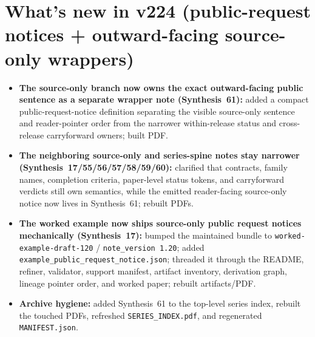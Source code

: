\documentclass[11pt]{article}
\begin{document}
\section{What's new in v224 (public-request notices + outward-facing source-only wrappers)}
\begin{itemize}[leftmargin=*]
\item \textbf{The source-only branch now owns the exact outward-facing public sentence as a separate wrapper note (Synthesis~61):} added a compact public-request-notice definition separating the visible source-only sentence and reader-pointer order from the narrower within-release status and cross-release carryforward owners; built PDF.
\item \textbf{The neighboring source-only and series-spine notes stay narrower (Synthesis~17/55/56/57/58/59/60):} clarified that contracts, family names, completion criteria, paper-level status tokens, and carryforward verdicts still own semantics, while the emitted reader-facing source-only notice now lives in Synthesis~61; rebuilt PDFs.
\item \textbf{The worked example now ships source-only public request notices mechanically (Synthesis~17):} bumped the maintained bundle to \texttt{worked-example-draft-120} / \texttt{note\_version 1.20}; added \texttt{example\_public\_request\_notice.json}; threaded it through the README, refiner, validator, support manifest, artifact inventory, derivation graph, lineage pointer order, and worked paper; rebuilt artifacts/PDF.
\item \textbf{Archive hygiene:} added Synthesis~61 to the top-level series index, rebuilt the touched PDFs, refreshed \texttt{SERIES\_INDEX.pdf}, and regenerated \texttt{MANIFEST.json}.
\end{itemize}
\end{document}
